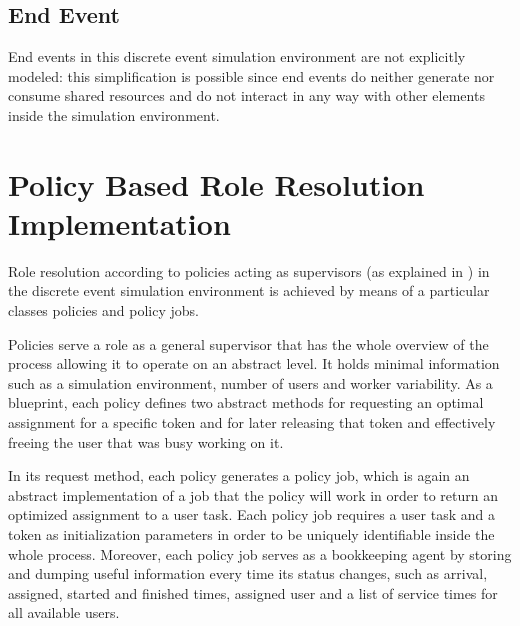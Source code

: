 \subsection{End Event}

End events in this discrete event simulation environment are not explicitly modeled: this simplification is possible since end events do neither generate nor consume shared resources and do not interact in any way with other elements inside the simulation environment.

\section{Policy Based Role Resolution Implementation}
\label{sec:policy_implementation}

Role resolution according to policies acting as supervisors (as explained in ) in the discrete event simulation environment is achieved by means of a particular classes \ie policies and policy jobs.

Policies serve a role as a general supervisor that has the whole overview of the process allowing it to operate on an abstract level. It holds minimal information such as a simulation environment, number of users and worker variability. As a blueprint, each policy defines two abstract methods for requesting an optimal assignment for a specific token and for later releasing that token and effectively freeing the user that was busy working on it.

In its request method, each policy generates a policy job, which is again an abstract implementation of a job that the policy will work in order to return an optimized assignment to a user task. Each policy job requires a user task and a token as initialization parameters in order to be uniquely identifiable inside the whole process. Moreover, each policy job serves as a bookkeeping agent by storing and dumping useful information every time its status changes, such as arrival, assigned, started and finished times, assigned user and a list of service times for all available users.

